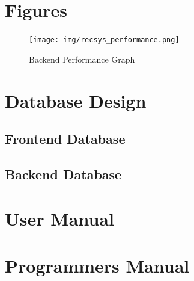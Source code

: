 \documentclass[11pt,letterpaper]{article}
\begin{document}
\section{Figures}
\begin{figure}
\centering
\texttt{[image: img/recsys\_performance.png]}
\caption{Backend Performance Graph}
\label{fig:test-performance}
\end{figure}



\section{Database Design}
\subsection{Frontend Database}
\subsection{Backend Database}

\section{User Manual}

\section{Programmers Manual}
\end{document}
